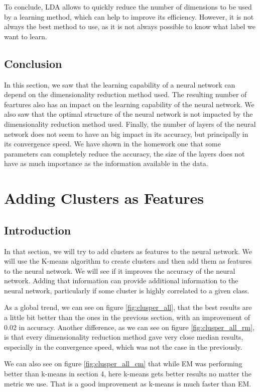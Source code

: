 \documentclass[twocolumn, 10pt]{article}
\begin{document}
			To conclude, LDA allows to quickly reduce the number of dimensions to be used by a learning method, which can help to improve its efficiency. However, it is not always the best method to use, as it is not always possible to know what label we want to learn.
		\subsection{Conclusion}
			In this section, we saw that the learning capability of a neural network can depend on the dimensionality reduction method used. The resulting number of feartures also has an impact on the learning capability of the neural network. We also saw that the optimal structure of the neural network is not impacted by the dimensionality reduction method used. Finally, the number of layers of the neural network does not seem to have an big impact in its accuracy, but principally in its convergence speed. We have shown in the homework one that some parameters can completely reduce the accuracy, the size of the layers does not have as much importance as the information available in the data.
	\section{Adding Clusters as Features}
		\subsection{Introduction}
			In that section, we will try to add clusters as features to the neural network. We will use the K-means algorithm to create clusters and then add them as features to the neural network. We will see if it improves the accuracy of the neural network. Adding that information can provide additional information to the neural network, particularly if some cluster is highly correlated to a given class.

			As a global trend, we can see on figure \ref{fig:clusper_all}, that the best results are a little bit better than the ones in the previous section, with an improvement of 0.02 in accuracy. Another difference, as we can see on figure \ref{fig:clusper_all_rm}, is that every dimensionality reduction method gave very close median results, especially in the convergence speed, which was not the case in the previously.

			We can also see on figure \ref{fig:clusper_all_cm} that while EM was performing better than k-means in section 4, here k-means gets better results no matter the metric we use. That is a good improvement as k-means is much faster than EM.
\end{document}
